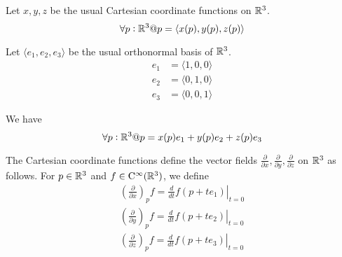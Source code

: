 \documentclass[11pt, oneside]{article}
\begin{document}
Let $x, y, z$ be the usual Cartesian coordinate functions on $\mathbb{R}^3$.
\begin{equation}
\forall p : \mathbb{R}^3 @ p = \langle x(p), y(p), z(p) \rangle
\end{equation}

Let $\langle e_1, e_2, e_3 \rangle$ be the usual orthonormal basis of $\mathbb{R}^3$.
\begin{align}
e_1 & = \langle 1, 0, 0 \rangle \\
e_2 & = \langle 0, 1, 0 \rangle \\
e_3 & = \langle 0, 0, 1 \rangle
\end{align}

We have
\begin{equation}
\forall p : \mathbb{R}^3 @ p = x(p) e_1 + y(p) e_2 + z(p) e_3
\end{equation}

The Cartesian coordinate functions define the vector fields $\frac{\partial}{\partial x}, \frac{\partial}{\partial y}, \frac{\partial}{\partial z}$
on $\mathbb{R}^3$ as follows. 
For $p \in \mathbb{R}^3$ and $f \in \operatorname{C^{\infty}}(\mathbb{R}^3)$, we define
\begin{align}
\left(\frac{\partial}{\partial x}\right)_p f = \left. \frac{d}{dt} f(p + t e_1) \right|_{t = 0} \\
\left(\frac{\partial}{\partial y}\right)_p f = \left. \frac{d}{dt} f(p + t e_2) \right|_{t = 0} \\
\left(\frac{\partial}{\partial z}\right)_p f = \left. \frac{d}{dt} f(p + t e_3) \right|_{t = 0}
\end{align}

\printbibliography
\end{document}
